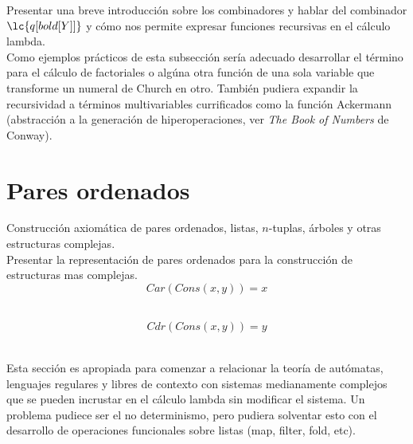 Presentar una breve introducción sobre los combinadores y hablar del combinador \( \lc{q[bold[Y]]} \) y cómo nos permite expresar funciones recursivas en el cálculo lambda. \\

Como ejemplos prácticos de esta subsección sería adecuado desarrollar el término para el cálculo de factoriales o algúna otra función de una sola variable que transforme un numeral de Church en otro. También pudiera expandir la recursividad a términos multivariables currificados como la función Ackermann (abstracción a la generación de hiperoperaciones, ver \emph{The Book of Numbers} de Conway). \\

\section{Pares ordenados}

Construcción axiomática de pares ordenados, listas, \(n\)-tuplas, árboles y otras estructuras complejas. \\

Presentar la representación de pares ordenados para la construcción de estructuras mas complejas. \\

\[ Car(Cons(x,y)) = x \] \

\[ Cdr(Cons(x,y)) = y \] \

Esta sección es apropiada para comenzar a relacionar la teoría de autómatas, lenguajes regulares y libres de contexto con sistemas medianamente complejos que se pueden incrustar en el cálculo lambda sin modificar el sistema. Un problema pudiece ser el no determinismo, pero pudiera solventar esto con el desarrollo de operaciones funcionales sobre listas (map, filter, fold, etc). \\

